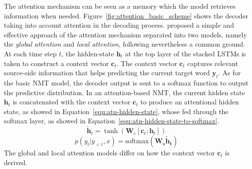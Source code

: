 The attention mechanism can be seen as a memory which the model retrieves information when needed. Figure~\ref{fig:attention_basic_scheme} shows the decoder taking into account attention in the decoding process. \citet{1508.04025} proposed a simple and effective approach of the attention mechanism separated into two models, namely the \textit{global attention} and \textit{local attention}, following nevertheless a common ground. At each time step $t$, the hidden-state $\bm{h}_t$ at the top layer of the stacked LSTMs is taken to construct a context vector $\bm{c}_t$.
The context vector $\bm{c}_t$ captures relevant source-side information that helps predicting the current target word $\bm{y}_t$. As for the basic NMT model, the decoder output is sent to a softmax function to output the predictive distribution. In an attention-based NMT, the current hidden state $\bm{h}_t$ is concatenated with the context vector $\bm{c}_t$ to produce an attentional hidden state, as showed in Equation~\ref{equ:atn-hidden-state}, whose fed through the softmax layer, as showed in Equation~\ref{equ:atn-hidden-state-to-softmax}.
\begin{equation}
    \bm{\tilde{h}}_t = \tanh ( \mathbf{W}_c [\bm{c}_t;\bm{h}_t])
    \label{equ:atn-hidden-state}
\end{equation}
\begin{equation}
    p( y_t | y _{<t}, x) = \mathrm{softmax(\mathbf{W_s}\bm{\tilde{h}_t})}
    \label{equ:atn-hidden-state-to-softmax}
\end{equation}
 The global and local attention models differ on how the context vector $\bm{c}_t$ is derived.

